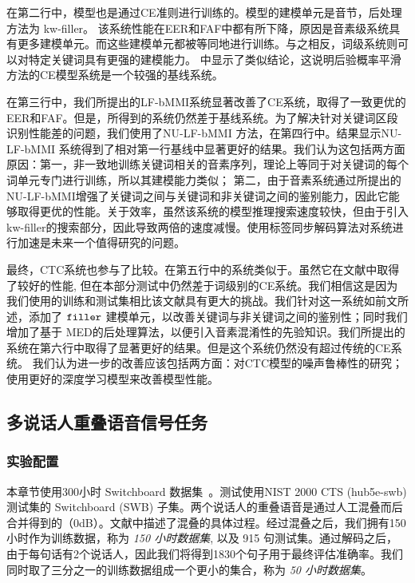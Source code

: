 在第二行中，模型也是通过CE准则进行训练的。模型的建模单元是音节，后处理方法为 kw-filler。 
该系统性能在EER和FAF中都有所下降，原因是音素级系统具有更多建模单元。而这些建模单元都被等同地进行训练。与之相反，词级系统则可以对特定关键词具有更强的建模能力。
\cite{chen2014small}中显示了类似结论，这说明后验概率平滑方法的CE模型系统是一个较强的基线系统。

在第三行中，我们所提出的LF-bMMI系统显著改善了CE系统，取得了一致更优的EER和FAF。但是，所得到的系统仍然差于基线系统。为了解决针对关键词区段识别性能差的问题，我们使用了NU-LF-bMMI 方法，在第四行中。结果显示NU-LF-bMMI 系统得到了相对第一行基线中显著更好的结果。我们认为这包括两方面原因：第一，非一致地训练关键词相关的音素序列，理论上等同于对关键词的每个词单元专门进行训练，所以其建模能力类似； 第二，由于音素系统通过所提出的NU-LF-bMMI增强了关键词之间与关键词和非关键词之间的鉴别能力，因此它能够取得更优的性能。关于效率，虽然该系统的模型推理搜索速度较快，但由于引入kw-filler的搜索部分，因此导致两倍的速度减慢。使用标签同步解码算法对系统进行加速是未来一个值得研究的问题。

最终，CTC系统也参与了比较。在第五行中的系统类似于\cite{fernandez2007application}。虽然它在文献\cite{fernandez2007application}中取得了较好的性能, 但在本部分测试中仍然差于词级别的CE系统。我们相信这是因为我们使用的训练和测试集相比该文献具有更大的挑战。我们针对这一系统如前文所述，添加了 $\tt filler$ 建模单元，以改善关键词与非关键词之间的鉴别性；同时我们增加了基于 MED的后处理算法，以便引入音素混淆性的先验知识。我们所提出的系统在第六行中取得了显著更好的结果。但是这个系统仍然没有超过传统的CE系统。
我们认为进一步的改善应该包括两方面：对CTC模型的噪声鲁棒性的研究；使用更好的深度学习模型来改善模型性能。


\subsection{多说话人重叠语音信号任务}
\label{Sec:exp-pit}

\subsubsection{实验配置}
\label{Sec:exp-pit-setup}

本章节使用300小时 Switchboard 数据集~\cite{godfrey1992switchboard}。测试使用NIST
2000 CTS (hub5e-swb) 测试集的 Switchboard (SWB) 子集。两个说话人的重叠语音是通过人工混叠而后合并得到的（0dB）。文献\cite{chen2018progressive}中描述了混叠的具体过程。经过混叠之后，我们拥有150小时作为训练数据，称为 {\em{150 小时数据集}}, 以及 915 句测试集。通过解码之后，由于每句话有2个说话人，因此我们将得到1830个句子用于最终评估准确率。我们同时取了三分之一的训练数据组成一个更小的集合，称为 {\em{50 小时数据集}}。

